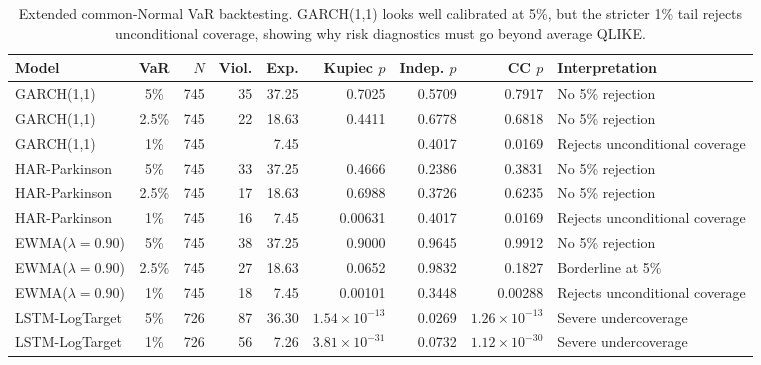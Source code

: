 \begin{table}[!t]
\centering
\caption{Extended common-Normal VaR backtesting. GARCH(1,1) looks well calibrated at 5\%, but the stricter 1\% tail rejects unconditional coverage, showing why risk diagnostics must go beyond average QLIKE.}
\label{tab:var-backtests}
\scriptsize
\renewcommand{\arraystretch}{0.95}
\setlength{\tabcolsep}{4pt}
\begin{tabular}{@{}L{0.22\textwidth}c r r r r r r L{0.20\textwidth}@{}}
\toprule
Model & VaR & \(N\) & Viol. & Exp. & Kupiec \(p\) & Indep. \(p\) & CC \(p\) & Interpretation \\
\midrule
GARCH(1,1) & 5\% & 745 & 35 & 37.25 & 0.7025 & 0.5709 & 0.7917 & No 5\% rejection \\
GARCH(1,1) & 2.5\% & 745 & 22 & 18.63 & 0.4411 & 0.6778 & 0.6818 & No 5\% rejection \\
GARCH(1,1) & 1\% & 745 &  & 7.45 &  & 0.4017 & 0.0169 & Rejects unconditional coverage \\
HAR-Parkinson & 5\% & 745 & 33 & 37.25 & 0.4666 & 0.2386 & 0.3831 & No 5\% rejection \\
HAR-Parkinson & 2.5\% & 745 & 17 & 18.63 & 0.6988 & 0.3726 & 0.6235 & No 5\% rejection \\
HAR-Parkinson & 1\% & 745 & 16 & 7.45 & 0.00631 & 0.4017 & 0.0169 & Rejects unconditional coverage \\
EWMA(\(\lambda=0.90\)) & 5\% & 745 & 38 & 37.25 & 0.9000 & 0.9645 & 0.9912 & No 5\% rejection \\
EWMA(\(\lambda=0.90\)) & 2.5\% & 745 & 27 & 18.63 & 0.0652 & 0.9832 & 0.1827 & Borderline at 5\% \\
EWMA(\(\lambda=0.90\)) & 1\% & 745 & 18 & 7.45 & 0.00101 & 0.3448 & 0.00288 & Rejects unconditional coverage \\
LSTM-LogTarget & 5\% & 726 & 87 & 36.30 & \(1.54{\times}10^{-13}\) & 0.0269 & \(1.26{\times}10^{-13}\) & Severe undercoverage \\
LSTM-LogTarget & 1\% & 726 & 56 & 7.26 & \(3.81{\times}10^{-31}\) & 0.0732 & \(1.12{\times}10^{-30}\) & Severe undercoverage \\
\bottomrule
\end{tabular}
\end{table}
